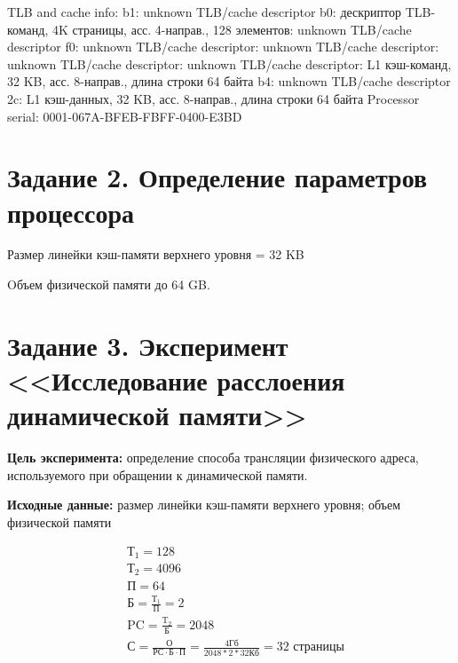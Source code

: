 \noindent
TLB and cache info:\newline
b1: unknown TLB/cache descriptor\newline
b0: дескриптор TLB-команд, 4K страницы, асс. 4-направ., 128 элементов: unknown TLB/cache descriptor\newline
f0: unknown TLB/cache descriptor: unknown TLB/cache descriptor: unknown TLB/cache descriptor: unknown TLB/cache descriptor: L1 кэш-команд, 32 KB, асс. 8-направ., длина строки 64 байта\newline
b4: unknown TLB/cache descriptor\newline
2c: L1 кэш-данных, 32 KB, асс. 8-направ., длина строки 64 байта\newline
Processor serial: 0001-067A-BFEB-FBFF-0400-E3BD\newline
    

    \section{Задание 2. Определение параметров процессора}
    
        \noindent
        Размер линейки кэш-памяти верхнего уровня = 32 KB
    
        \noindent
        Oбъем физической памяти до 64 GB.
    
    \newpage
    
    \section{Задание 3. Эксперимент <<Исследование расслоения динамической памяти>>}

        \textbf{Цель   эксперимента:} определение   способа   трансляции   физического   адреса, используемого при обращении к динамической памяти.   
        
        \textbf{Исходные данные:} размер линейки кэш-памяти верхнего уровня; объем физической памяти
        
        
        \[
            \begin{aligned}
                &\text{Т}_1 = 128\\
                &\text{Т}_2 = 4096\\
                &\text{П} = 64\\
                &\text{Б} = \frac{\text{Т}_1}{\text{П}} = 2\\
                &\text{PC} = \frac{\text{T}_2}{\text{Б}} = 2048\\
                &\text{С} = \frac{\text{О}}{\text{РС} \cdot \text{Б} \cdot \text{П}} = \frac{4\text{Гб}}{2048 * 2 * 32 \text{Кб}}= 32 \text{ страницы}\\
            \end{aligned}
        \]
        
